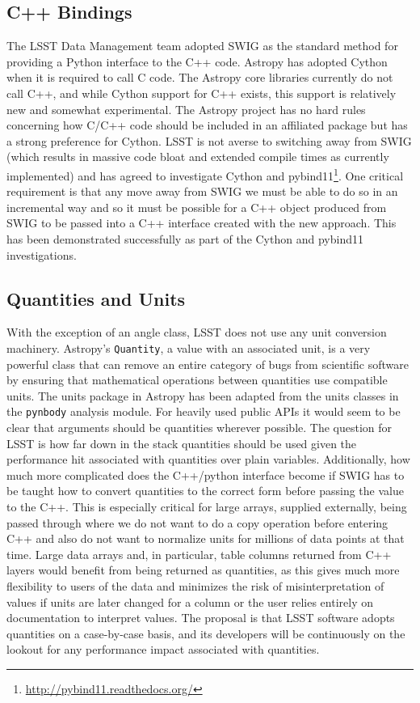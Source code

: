 \documentclass[]{spie}  %
\begin{document}
\subsection{C++ Bindings}

The LSST Data Management team adopted SWIG as the standard method for providing a Python interface to the C++ code.
Astropy has adopted Cython\cite{2010/content/aip/journal/cise/13/2/10.1109/MCSE.2010.118} when it is required to call C code.
The Astropy core libraries currently do not call C++, and while Cython support for C++ exists, this support is relatively new and somewhat experimental.
The Astropy project has no hard rules concerning how C/C++ code should be included in an affiliated package but has a strong preference for Cython.
LSST is not averse to switching away from SWIG (which results in massive code bloat and extended compile times as currently implemented) and has agreed to investigate Cython\cite{dmtn-013} and pybind11\cite{dmtn-014}\footnote{\url{http://pybind11.readthedocs.org/}}.
One critical requirement is that any move away from SWIG we must be able to do so in an incremental way and so it must be possible for a C++ object produced from SWIG to be passed into a C++ interface created with the new approach.
This has been demonstrated successfully as part of the Cython and pybind11 investigations.

\subsection{Quantities and Units}

With the exception of an angle class, LSST does not use any unit conversion machinery.
Astropy's \texttt{Quantity}, a value with an associated unit, is a very powerful class that can remove an entire category of bugs from scientific software by ensuring that mathematical operations between quantities use compatible units.
The units package in Astropy has been adapted from the units classes in the \texttt{pynbody} analysis module\cite{pynbody}.
For heavily used public APIs it would seem to be clear that arguments should be quantities wherever possible.
The question for LSST is how far down in the stack quantities should be used given the performance hit associated with quantities over plain variables.
Additionally, how much more complicated does the C++/python interface become if SWIG has to be taught how to convert quantities to the correct form before passing the value to the C++.
This is especially critical for large arrays, supplied externally, being passed through where we do not want to do a copy operation before entering C++ and also do not want to normalize units for millions of data points at that time.
Large data arrays and, in particular, table columns returned from C++ layers would benefit from being returned as quantities, as this gives much more flexibility to users of the data and minimizes the risk of misinterpretation of values if units are later changed for a column or the user relies entirely on documentation to interpret values.
The proposal is that LSST software adopts quantities on a case-by-case basis, and its developers will be continuously on the lookout for any performance impact associated with quantities.
\end{document}
